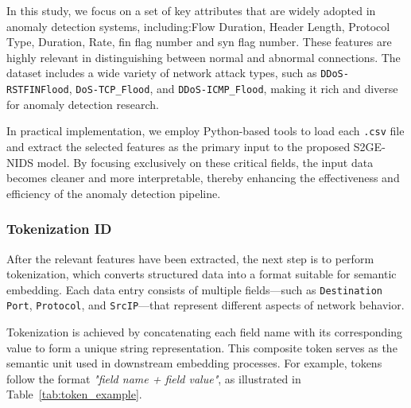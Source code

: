 \begin{ZhChapter}
In this study, we focus on a set of key attributes that are widely adopted in anomaly detection systems, including:Flow Duration, Header Length, Protocol Type, Duration, Rate, fin flag number and syn flag number. These features are highly relevant in distinguishing between normal and abnormal connections. The dataset includes a wide variety of network attack types, such as \texttt{DDoS-RSTFINFlood}, \texttt{DoS-TCP\_Flood}, and \texttt{DDoS-ICMP\_Flood}, making it rich and diverse for anomaly detection research.

In practical implementation, we employ Python-based tools to load each \texttt{.csv} file and extract the selected features as the primary input to the proposed S2GE-NIDS model. By focusing exclusively on these critical fields, the input data becomes cleaner and more interpretable, thereby enhancing the effectiveness and efficiency of the anomaly detection pipeline.


\subsubsection{Tokenization ID}
After the relevant features have been extracted, the next step is to perform tokenization, which converts structured data into a format suitable for semantic embedding. Each data entry consists of multiple fields—such as \texttt{Destination Port}, \texttt{Protocol}, and \texttt{SrcIP}—that represent different aspects of network behavior.

Tokenization is achieved by concatenating each field name with its corresponding value to form a unique string representation. This composite token serves as the semantic unit used in downstream embedding processes. For example, tokens follow the format \textit{"field name + field value"}, as illustrated in Table~\ref{tab:token_example}.


\begin{table}[htbp]
    \centering
    \caption{Example of Tokenized Input Fields} \label{tab:token_example}
\end{table}




\end{ZhChapter}
